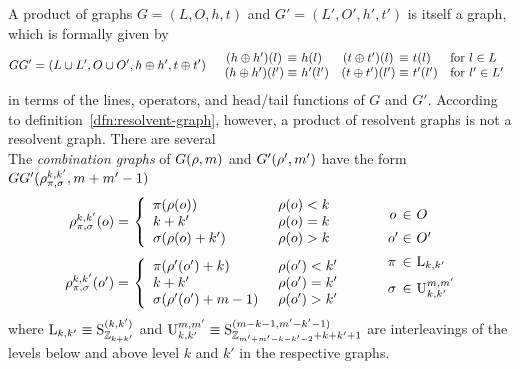 \documentclass[11pt]{article}
\numberwithin{equation}{section}
\begin{document}
\begin{dfn}
A product of graphs $G=(L,O,h,t)$ and $G'=(L',O',h',t')$ is itself a graph, which is formally given by
\begin{align}
  GG'
=
  (L\cup L', O\cup O', h\oplus h', t\oplus t')
&&
\begin{array}{r@{\ }lr@{\ }ll}
  (h\oplus h')(l)\, \equiv& h(l)
&
  (t\oplus t')(l)\, \equiv& t(l)
&
  \text{for $l\in L$}
\\
  (h\oplus h')(l')  \equiv& h'(l')
&
  (t\oplus t')(l')  \equiv& t'(l')
&
  \text{for $l'\in L'$} \\
\end{array}
\end{align}
in terms of the lines, operators, and head/tail functions of $G$ and $G'$.
According to definition~\ref{dfn:resolvent-graph}, however, a product of resolvent graphs is not a resolvent graph.
There are several \ld\\
The \textit{combination graphs} of $G(\rho ,m)$ and $G'(\rho ',m')$ have the form
$GG'(\rh_{\pi,\si}^{k,k'},m+m'-1)$\\
\begin{align*}
\begin{array}{r@{\ }l}
  \rh_{\pi,\si}^{k,k'}(o)
=&
\left\{
\begin{array}{ll}
  \pi(\rh(o))      & \rh(o)<k \\
  k + k'           & \rh(o)=k \\
  \makebox[2.8cm][l]{$\si(\rh(o) + k')$} & \rh(o)>k \\
\end{array}
\right.
\\[20pt]
  \rh_{\pi,\si}^{k,k'}(o')
=&
\left\{
\begin{array}{ll}
  \pi(\rh'(o') + k)   & \rh(o')<k' \\
  k + k'              & \rh(o')=k' \\
  \makebox[2.8cm][l]{$\si(\rh'(o') + m-1)$} & \rh(o')>k' \\
\end{array}
\right.
\end{array}
\hspace{20pt}
\begin{array}{r@{\ }l}
  o\,
\in&
  O
\\[5pt]
  o'
\in&
  O'
\\[5pt]
  \pi\,
\in&
  \mr{L}_{k,k'}
\\[5pt]
  \si\,
\in&
  \mr{U}_{k,k'}^{m,m'}
\end{array}
\end{align*}
where
$
  \mathrm{L}_{k,k'}
\equiv
  \mathrm{S}^{(k,k')}_{\mathbb{Z}_{k+k'}}
$
and
$
  \mathrm{U}_{k,k'}^{m,m'}
\equiv
  \mathrm{S}^{(m-k-1,m'-k'-1)}_{\mathbb{Z}_{m'+m'-k-k'-2} + k + k' + 1}
$
are interleavings of the levels below and above level $k$ and $k'$ in the respective graphs.
\end{dfn}
\end{document}
